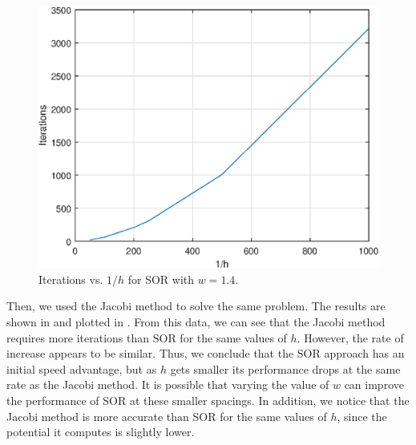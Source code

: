 \documentclass[journal,hidelinks]{IEEEtran}
\begin{document}
\begin{figure}[!htb]
  \centering
  \includegraphics[width=0.6\columnwidth]{question-3/h_iter_sor.eps}
  \caption{Iterations vs. $1/h$ for SOR with $w = 1.4$.}
  \label{fig:q3-h-iter-sor}
\end{figure}

Then, we used the Jacobi method to solve the same problem. The results are shown in  and plotted in . From this data, we can see that the Jacobi method requires more iterations than SOR for the same values of $h$. However, the rate of increase appears to be similar. Thus, we conclude that the SOR approach has an initial speed advantage, but as $h$ gets smaller its performance drops at the same rate as the Jacobi method. It is possible that varying the value of $w$ can improve the performance of SOR at these smaller spacings. In addition, we notice that the Jacobi method is more accurate than SOR for the same values of $h$, since the potential it computes is slightly lower.

\begin{table}[!htb]
  \centering
  \caption{Results for the Jacobi method for different values of $h$.}
  \label{tab:q3-h-jacobi}
\end{table}
\end{document}
